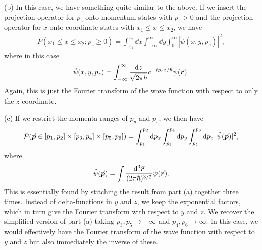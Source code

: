 {%
%
%

(b) In this case, we have something quite similar to the above.
If we insert the projection operator for $p_{z}$ onto momentum states with $p_{z} > 0$ and the projection operator for $x$ onto coordinate states with $x_1 \leq x \leq x_2$, we have
\begin{eqnarray}
    P(x_1 \leq x \leq x_2; p_{z} \geq 0) = \int_{x_1}^{x_2} \dd{x} \int_{-\infty}^{\infty} \dd{y} \int_{0}^{\infty} |\tilde{\psi}(x,y,p_{z})|^2
,\end{eqnarray}
where in this case
\begin{eqnarray}
    \tilde{\psi}(x,y,p_{z}) = \int_{-\infty}^{\infty} \frac{\dd{z}}{\sqrt{2 \pi \hbar}} e^{-i p_{z} z / \hbar} \psi(\va*{r})
.\end{eqnarray}
Again, this is just the Fourier transform of the wave function with respect to only the $z$-coordinate.

(c) If we restrict the momenta ranges of $p_{y}$ and $p_{z}$, we then have
\begin{eqnarray}
    \mathcal{P}(\va*{p} \in [p_1,p_2] \times [p_3,p_4] \times [p_5,p_6]) = \int_{p_1}^{p_2} \dd{p_{x}} \int_{p_3}^{p_4} \dd{p_{y}} \int_{p_5}^{p_6} \dd{p_{z}} |\tilde{\psi}(\va*{p})|^2
,\end{eqnarray}
where
\begin{eqnarray}
    \tilde{\psi}(\va*{p}) = \int \frac{\dd[3]{\va*{r}}}{(2 \pi \hbar)^{3/2}} \psi(\va*{r})
.\end{eqnarray}
This is essentially found by stitching the result from part (a) together three times.
Instead of delta-functions in $y$ and $z$, we keep the exponential factors, which in turn give the Fourier transform with respect to $y$ and $z$.
We recover the simplified version of part (a) taking $p_3,p_5 \rightarrow -\infty$ and $p_4,p_6 \rightarrow \infty$.
In this case, we would effectively have the Fourier transform of the wave function with respect to $y$ and $z$ but also immediately the inverse of these.


}


